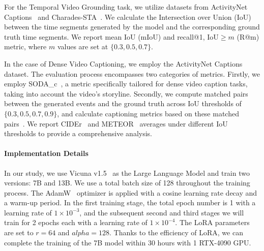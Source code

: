 \documentclass[10pt,twocolumn,letterpaper]{article}
\begin{document}
For the Temporal Video Grounding task, we utilize datasets from ActivityNet Captions~\cite{anne2017localizing_grounding10} and Charades-STA~\cite{gao2017tall_grounding9}. We calculate the Intersection over Union (IoU) between the time segments generated by the model and the corresponding ground truth time segments. We report mean IoU (mIoU) and recall@1, IoU$\ge m$ (R@m) metric, where $m$ values are set at $\{0.3, 0.5, 0.7\}$. 

In the case of Dense Video Captioning, we employ the ActivityNet Captions~\cite{anne2017localizing_grounding10} dataset. The evaluation process encompasses two categories of metrics. Firstly, we employ SODA\_c~\cite{fujita2020soda}, a metric specifically tailored for dense video caption tasks, taking into account the video's storyline. Secondly, we compute matched pairs between the generated events and the ground truth across IoU thresholds of $\{0.3, 0.5, 0.7, 0.9\}$, and calculate captioning metrics based on these matched pairs~\cite{yang2023vid2seq}. We report CIDEr~\cite{vedantam2015cider} and METEOR~\cite{banerjee2005meteor} averages under different IoU thresholds to provide a comprehensive analysis.

\paragraph{Implementation Details} In our study, we use Vicuna v1.5~\cite{vicuna2023} as the Large Language Model and train two versions: 7B and 13B. We use a total batch size of 128 throughout the training process. The AdamW~\cite{loshchilov2017decoupled_adamw} optimizer is applied with a cosine learning rate decay and a warm-up period. In the first training stage, the total epoch number is 1 with a learning rate of $1\times 10^{-3}$, and the subsequent second and third stages we will train for 2 epochs each with a learning rate of $1\times 10^{-4}$. The LoRA parameters are set to $r=64$ and $alpha=128$. Thanks to the efficiency of LoRA, we can complete the training of the 7B model within 30 hours with 1 RTX-4090 GPU.
\end{document}

